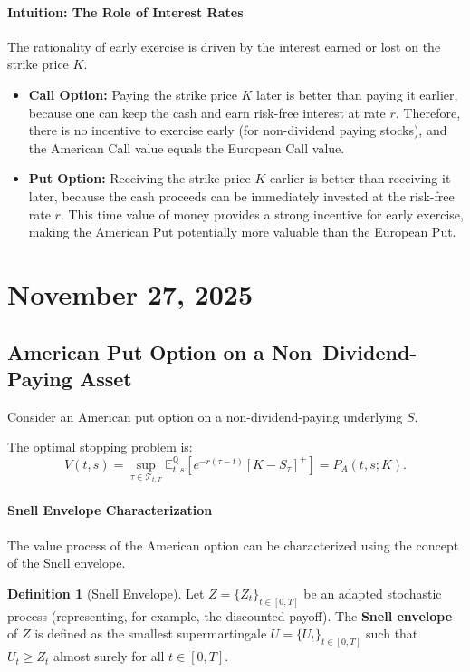 \documentclass[12pt,a4paper]{article}
\theoremstyle{definition}
\newtheorem{definition}{Definition}[section]
\begin{document}
\paragraph{Intuition: The Role of Interest Rates}
The rationality of early exercise is driven by the interest earned or lost on the strike price $K$.
\begin{itemize}
    \item \textbf{Call Option:} Paying the strike price $K$ later is better than paying it earlier, because one can keep the cash and earn risk-free interest at rate $r$. Therefore, there is no incentive to exercise early (for non-dividend paying stocks), and the American Call value equals the European Call value.
    \item \textbf{Put Option:} Receiving the strike price $K$ earlier is better than receiving it later, because the cash proceeds can be immediately invested at the risk-free rate $r$. This time value of money provides a strong incentive for early exercise, making the American Put potentially more valuable than the European Put.
\end{itemize}

\newpage
\section{November 27, 2025}

\subsection{American Put Option on a Non--Dividend-Paying Asset}

Consider an American put option on a non-dividend-paying underlying $S$.

The optimal stopping problem is:
\[
V(t, s) = \sup_{\tau \in \mathcal{T}_{t,T}} \mathbb{E}_{t,s}^{\mathbb{Q}}\![e^{-r(\tau - t)} [K - S_\tau]^+] = P_A(t, s; K).
\]

\paragraph{Snell Envelope Characterization}
The value process of the American option can be characterized using the concept of the Snell envelope.

\begin{definition}[Snell Envelope]
Let $Z = \{Z_t\}_{t \in [0,T]}$ be an adapted stochastic process (representing, for example, the discounted payoff). The \textbf{Snell envelope} of $Z$ is defined as the smallest supermartingale $U = \{U_t\}_{t \in [0,T]}$ such that $U_t \geq Z_t$ almost surely for all $t \in [0,T]$.
\end{definition}
\end{document}
